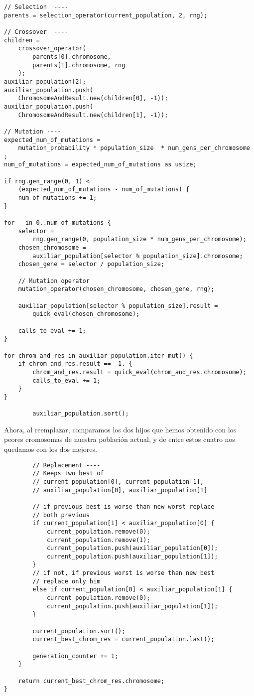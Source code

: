 \documentclass[size=a4, parskip=half, titlepage=false, toc=flat, toc=bib, 12pt]{scrartcl}
\begin{document}
\begin{verbatim}
// Selection  ----
parents = selection_operator(current_population, 2, rng);

// Crossover  ----
children =
    crossover_operator(
        parents[0].chromosome,
        parents[1].chromosome, rng
    );
auxiliar_population[2];
auxiliar_population.push(
    ChromosomeAndResult.new(children[0], -1));
auxiliar_population.push(
    ChromosomeAndResult.new(children[1], -1));

// Mutation ----
expected_num_of_mutations =
    mutation_probability * population_size  * num_gens_per_chromosome ;
num_of_mutations = expected_num_of_mutations as usize;

if rng.gen_range(0, 1) <
    (expected_num_of_mutations - num_of_mutations) {
    num_of_mutations += 1;
}

for _ in 0..num_of_mutations {
    selector =
        rng.gen_range(0, population_size * num_gens_per_chromosome);
    chosen_chromosome =
        auxiliar_population[selector % population_size].chromosome;
    chosen_gene = selector / population_size;

    // Mutation operator
    mutation_operator(chosen_chromosome, chosen_gene, rng);

    auxiliar_population[selector % population_size].result =
        quick_eval(chosen_chromosome);

    calls_to_eval += 1;
}

for chrom_and_res in auxiliar_population.iter_mut() {
    if chrom_and_res.result == -1. {
        chrom_and_res.result = quick_eval(chrom_and_res.chromosome);
        calls_to_eval += 1;
    }
}

        auxiliar_population.sort();
\end{verbatim}
Ahora, al reemplazar, comparamos los dos hijos que hemos obtenido con los peores cromosomas de nuestra población actual, y de entre estos cuatro nos quedamos con los dos mejores.
\begin{verbatim}
        // Replacement ----
        // Keeps two best of
        // current_population[0], current_population[1],
        // auxiliar_population[0], auxiliar_population[1]

        // if previous best is worse than new worst replace
        // both previous
        if current_population[1] < auxiliar_population[0] {
            current_population.remove(0);
            current_population.remove(1);
            current_population.push(auxiliar_population[0]);
            current_population.push(auxiliar_population[1]);
        }
        // if not, if previous worst is worse than new best
        // replace only him
        else if current_population[0] < auxiliar_population[1] {
            current_population.remove(0);
            current_population.push(auxiliar_population[1]);
        }

        current_population.sort();
        current_best_chrom_res = current_population.last();

        generation_counter += 1;
    }

    return current_best_chrom_res.chromosome;
}

\end{verbatim}
\end{document}
